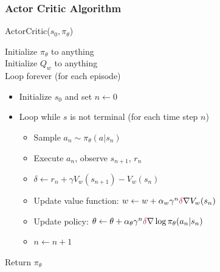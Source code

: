\documentclass[11pt,table]{beamer}
\begin{document}
\begin{frame}
\frametitle{Actor Critic Algorithm}

\begin{tcolorbox}[colframe=black, boxrule=1pt, sharp corners]

\textcolor{red1}{ActorCritic(\( s_0, \pi_\theta \))}


Initialize \( \pi_\theta \) to anything\\
Initialize \( Q_w \) to anything\\
Loop forever (for each episode)
\begin{itemize}
    \item[] Initialize \( s_0 \) and set \( n \leftarrow 0 \)
    \item[] Loop while \( s \) is not terminal (for each time step \( n \))
    \begin{itemize}
        \item[] Sample \( a_n \sim \pi_\theta(a|s_n) \)
        \item[] Execute \( a_n \), observe \( s_{n+1} \), \( r_n \)
        \item[] \textcolor{red1}{\( \delta \leftarrow r_n + \gamma V_w(s_{n+1}) - V_w(s_n) \)}
        \item[] Update \textcolor{red1}{value} function: \( w \leftarrow w + \alpha_w \gamma^n \textcolor{red1}{\delta} \nabla V_w(s_n) \)
        \item[] Update \textcolor{red1}{policy}: \( \theta \leftarrow \theta + \alpha_\theta \gamma^n \textcolor{red1}{\delta} \nabla \log \pi_\theta(a_n|s_n) \)
        \item[] \( n \leftarrow n + 1 \)
    \end{itemize}
\end{itemize}

Return \( \pi_\theta \)

\end{tcolorbox}

\end{frame}
\end{document}
